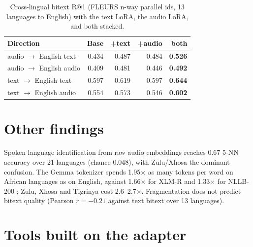 \documentclass[11pt]{article}
\makeatletter
\newcommand{\rone}{R@1}
\makeatother
\begin{document}
\begin{table}[t]
  \centering
  \small
  \setlength{\tabcolsep}{4pt}
  \begin{tabular}{lrrrr}
    \toprule
    Direction & Base & +text & +audio & both \\
    \midrule
    audio $\to$ English text  & 0.434 & 0.487 & 0.484 & \textbf{0.526} \\
    audio $\to$ English audio & 0.409 & 0.481 & 0.446 & \textbf{0.492} \\
    text $\to$ English text   & 0.597 & 0.619 & 0.597 & \textbf{0.644} \\
    text $\to$ English audio  & 0.554 & 0.573 & 0.546 & \textbf{0.602} \\
    \bottomrule
  \end{tabular}
  \caption{Cross-lingual bitext \rone{} (FLEURS n-way parallel ids, 13
  languages to English) with the text LoRA, the audio LoRA, and both stacked.}
  \label{tab:xling}
\end{table}

\section{Other findings}

Spoken language identification from raw audio embeddings reaches 0.67 5-NN accuracy over 21 languages (chance 0.048), with Zulu/Xhosa the dominant
confusion. The Gemma tokenizer spends 1.95$\times$ as many tokens per word on
African languages as on English, against 1.66$\times$ for XLM-R
\citep{conneau2020xlmr} and 1.33$\times$ for NLLB-200 \citep{nllb2022}; Zulu,
Xhosa and Tigrinya cost 2.6--2.7$\times$. Fragmentation does not predict bitext quality (Pearson $r=-0.21$ against text bitext over 13 languages).

\section{Tools built on the adapter}
\label{sec:tools}
\end{document}
